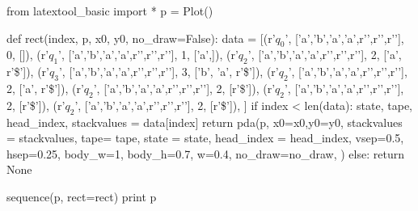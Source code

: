 \begin{python}
from latextool_basic import *
p = Plot()

def rect(index, p, x0, y0, no_draw=False):
    data = [(r'$q_0$',
             ['a','b','a','a',r'\SPACE',r'\SPACE',r'\SPACE'],
             0,
             []),
            (r'$q_1$',
             ['a','b','a','a',r'\SPACE',r'\SPACE',r'\SPACE'],
             1,
             ['a',]), 
            (r'$q_2$',
             ['a','b','a','a',r'\SPACE',r'\SPACE',r'\SPACE'],
             2,
             ['a', r'\$']),
            (r'$q_3$',
             ['a','b','a','a',r'\SPACE',r'\SPACE',r'\SPACE'],
             3,
             ['b', 'a', r'\$']),
            (r'$q_2$',
             ['a','b','a','a',r'\SPACE',r'\SPACE',r'\SPACE'],
             2,
             ['a', r'\$']),
            (r'$q_2$',
             ['a','b','a','a',r'\SPACE',r'\SPACE',r'\SPACE'],
             2,
             [r'\$']),
            (r'$q_2$',
             ['a','b','a','a',r'\SPACE',r'\SPACE',r'\SPACE'],
             2,
             [r'\$']),
            (r'$q_2$',
             ['a','b','a','a',r'\SPACE',r'\SPACE',r'\SPACE'],
             2,
             [r'\$']),
            ]
    if index < len(data):
        state, tape, head_index, stackvalues = data[index]    
        return pda(p,
               x0=x0,y0=y0,
               stackvalues = stackvalues,
               tape= tape,
               state = state,
               head_index = head_index,
               vsep=0.5, hsep=0.25,
               body_w=1, body_h=0.7, w=0.4,
               no_draw=no_draw,
               )
    else:
        return None

sequence(p, rect=rect)
print p
\end{python}


